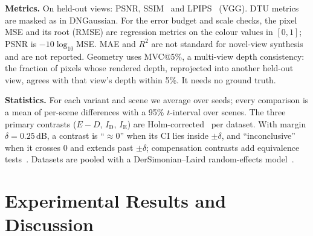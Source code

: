 \documentclass[conference]{IEEEtran}
\newcommand{\dB}{\,dB}
\newcommand{\ID}{I_{\mathrm{D}}}
\newcommand{\IE}{I_{\mathrm{E}}}
\begin{document}
\textbf{Metrics.} On held-out views: PSNR, SSIM~\cite{wang2004ssim} and LPIPS~\cite{zhang2018lpips} (VGG). DTU metrics are masked as in DNGaussian. For the error budget and scale checks, the pixel MSE and its root (RMSE) are regression metrics on the colour values in $[0,1]$; PSNR is $-10\log_{10}$MSE. MAE and $R^2$ are not standard for novel-view synthesis and are not reported. Geometry uses MVC@5\%, a multi-view depth consistency: the fraction of pixels whose rendered depth, reprojected into another held-out view, agrees with that view's depth within 5\%. It needs no ground truth.

\textbf{Statistics.} For each variant and scene we average over seeds; every comparison is a mean of per-scene differences with a 95\% $t$-interval over scenes. The three primary contrasts ($E-D$, $\ID$, $\IE$) are Holm-corrected~\cite{holm1979} per dataset. With margin $\delta=0.25$\dB, a contrast is ``$\approx 0$'' when its CI lies inside $\pm\delta$, and ``inconclusive'' when it crosses 0 and extends past $\pm\delta$; compensation contrasts add equivalence tests~\cite{lakens2017equivalence}. Datasets are pooled with a DerSimonian--Laird random-effects model~\cite{dersimonian1986}.

\section{Experimental Results and Discussion}\label{sec:results}
\end{document}
